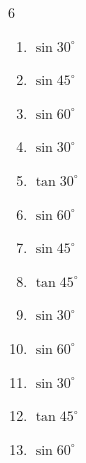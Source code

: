 \begin{multicols}{6}
\begin{enumerate}
  \item $\displaystyle \sin{30^\circ}$


  \item $\displaystyle \sin{45^\circ}$


  \item $\displaystyle \sin{60^\circ}$


  \item $\displaystyle \sin{30^\circ}$


  \item $\displaystyle \tan{30^\circ}$


  \item $\displaystyle \sin{60^\circ}$


  \item $\displaystyle \sin{45^\circ}$


  \item $\displaystyle \tan{45^\circ}$

        \phantom{$\displaystyle =1$}

  \item $\displaystyle \sin{30^\circ}$


  \item $\displaystyle \sin{60^\circ}$


\columnbreak %

  \item $\displaystyle \sin{30^\circ}$


  \item $\displaystyle \tan{45^\circ}$

        \phantom{$\displaystyle =1$}

  \item $\displaystyle \sin{60^\circ}$


\end{enumerate}
\end{multicols}
